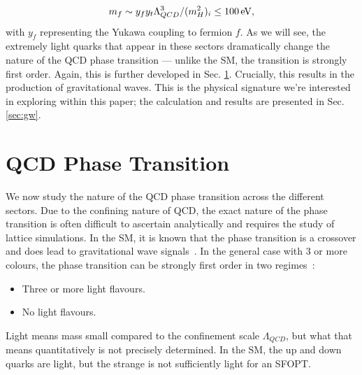 \documentclass[nofootinbib,twocolumn,preprintnumbers]{revtex4-1}
\begin{document}
\begin{equation}\label{eqn:exoticFM}
m_f \sim y_f y_t \Lambda_{QCD}^3/(m^2_H)_i \leq 100 \,{\rm eV},
\end{equation}
with $y_f$ representing the Yukawa coupling to fermion $f$. As we will see, the extremely light quarks that appear in these sectors dramatically change the nature of the QCD phase transition --- unlike the SM, the transition is strongly first order. Again, this is further developed in Sec. \ref{sec:dQCD}. Crucially, this results in the production of gravitational waves. This is the physical signature we're interested in exploring within this paper; the calculation and results are presented in Sec. \ref{sec:gw}. 
\section{QCD Phase Transition}
\label{sec:dQCD}
%
We now study the nature of the QCD phase transition across the different sectors. Due to the confining nature of QCD, the exact nature of the phase transition is often difficult to ascertain analytically and requires the study of lattice simulations. In the SM, it is known that the phase transition is a crossover and does lead to gravitational wave signals~\cite{Aoki:2006we,Bhattacharya:2014ara}. In the general case with 3 or more colours, the phase transition can be strongly first order in two regimes~\cite{Panero:2009tv,SVETITSKY1982423,Pisarski:1983ms}:
\begin{itemize}
\item Three or more light flavours.
\item No light flavours. 
\end{itemize}
Light means mass small compared to the confinement scale $\Lambda_{QCD}$, but what that means quantitatively is not precisely determined. In the SM, the up and down quarks are light, but the strange is not sufficiently light for an SFOPT.
\end{document}
